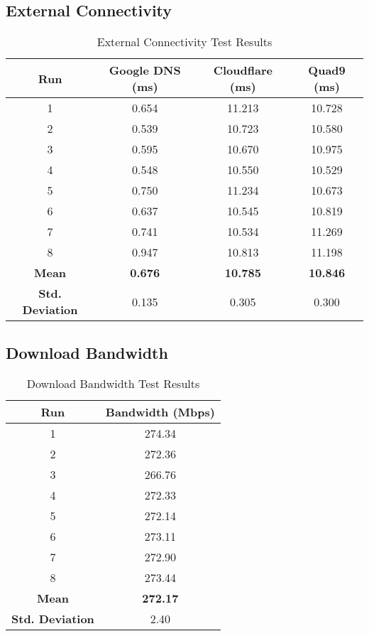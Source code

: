 \subsection{External Connectivity}
\begin{table}[H]
\centering
\begin{tabular}{|c|c|c|c|}
\hline
\textbf{Run} & \textbf{Google DNS (ms)} & \textbf{Cloudflare (ms)} & \textbf{Quad9 (ms)} \\
\hline
1 & 0.654 & 11.213 & 10.728 \\
2 & 0.539 & 10.723 & 10.580 \\
3 & 0.595 & 10.670 & 10.975 \\
4 & 0.548 & 10.550 & 10.529 \\
5 & 0.750 & 11.234 & 10.673 \\
6 & 0.637 & 10.545 & 10.819 \\
7 & 0.741 & 10.534 & 11.269 \\
8 & 0.947 & 10.813 & 11.198 \\
\hline
\textbf{Mean} & \textbf{0.676} & \textbf{10.785} & \textbf{10.846} \\
\textbf{Std. Deviation} & 0.135 & 0.305 & 0.300 \\
\hline
\end{tabular}
\caption{External Connectivity Test Results}
\end{table}

\subsection{Download Bandwidth}
\begin{table}[H]
\centering
\begin{tabular}{|c|c|}
\hline
\textbf{Run} & \textbf{Bandwidth (Mbps)} \\
\hline
1 & 274.34 \\
2 & 272.36 \\
3 & 266.76 \\
4 & 272.33 \\
5 & 272.14 \\
6 & 273.11 \\
7 & 272.90 \\
8 & 273.44 \\
\hline
\textbf{Mean} & \textbf{272.17} \\
\textbf{Std. Deviation} & 2.40 \\
\hline
\end{tabular}
\caption{Download Bandwidth Test Results}
\end{table}
